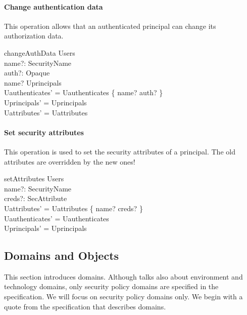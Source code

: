 \paragraph{Change authentication data} 
This operation allows that an authenticated principal can change its
authorization data.
\begin{schema}{changeAuthData}
  \Delta Users \\
  name?: SecurityName \\
  auth?: Opaque \\
  \where
  name? \in Uprincipals \\
  Uauthenticates' = Uauthenticates \oplus \{ name? \mapsto auth? \} \\
  Uprincipals' = Uprincipals \\
  Uattributes' = Uattributes \\
\end{schema}


\paragraph{Set security attributes} 
This operation is used to set the security attributes of a principal.  The old
attributes are overridden by the new ones!
\begin{schema}{setAttributes}
  \Delta Users \\
  name?: SecurityName \\
  creds?: \power SecAttribute \\
  \where
  Uattributes' = Uattributes \oplus \{ name? \mapsto creds? \} \\
  Uauthenticates' = Uauthenticates \\
  Uprincipals' = Uprincipals \\
\end{schema}


\subsection{Domains and Objects} \label{sec:domains}

\vspace{2ex}

This section introduces domains.  Although \corbasec{} talks also about
environment and technology domains, only security policy domains are specified
in the \corbasec{} specification.  We will focus on security policy domains
only.  We begin with a quote from the \corba{} specification that describes
domains.

